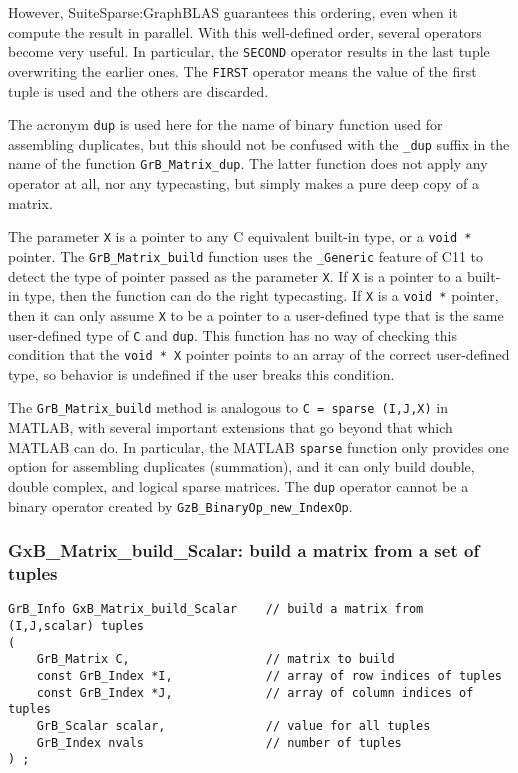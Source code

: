 \documentclass[12pt]{article}
\begin{document}
However, SuiteSparse:GraphBLAS guarantees this ordering, even when it compute
the result in parallel.  With this well-defined order, several operators become
very useful.  In particular, the \verb'SECOND' operator results in the last
tuple overwriting the earlier ones.  The \verb'FIRST' operator means the value
of the first tuple is used and the others are discarded.

The acronym \verb'dup' is used here for the name of binary function used for
assembling duplicates, but this should not be confused with the \verb'_dup'
suffix in the name of the function \verb'GrB_Matrix_dup'.  The latter function
does not apply any operator at all, nor any typecasting, but simply makes a
pure deep copy of a matrix.

The parameter \verb'X' is a pointer to any C equivalent built-in type, or a
\verb'void *' pointer.  The \verb'GrB_Matrix_build' function uses the
\verb'_Generic' feature of C11 to detect the type of pointer passed as the
parameter \verb'X'.  If \verb'X' is a pointer to a built-in type, then the
function can do the right typecasting.  If \verb'X' is a \verb'void *' pointer,
then it can only assume \verb'X' to be a pointer to a user-defined type that is
the same user-defined type of \verb'C' and \verb'dup'.  This function has no
way of checking this condition that the \verb'void * X' pointer points to an
array of the correct user-defined type, so behavior is undefined if the user
breaks this condition.

The \verb'GrB_Matrix_build' method is analogous to \verb'C = sparse (I,J,X)' in
MATLAB, with several important extensions that go beyond that which MATLAB can
do.  In particular, the MATLAB \verb'sparse' function only provides one option
for assembling duplicates (summation), and it can only build double, double
complex, and logical sparse matrices.
%
The \verb'dup' operator cannot be a binary operator
created by \verb'GzB_BinaryOp_new_IndexOp'.

\subsubsection{{\sf GxB\_Matrix\_build\_Scalar:} build a matrix from a set of tuples}
\label{matrix_build_Scalar}

\begin{mdframed}[userdefinedwidth=6in]
{\footnotesize
\begin{verbatim}
GrB_Info GxB_Matrix_build_Scalar    // build a matrix from (I,J,scalar) tuples
(
    GrB_Matrix C,                   // matrix to build
    const GrB_Index *I,             // array of row indices of tuples
    const GrB_Index *J,             // array of column indices of tuples
    GrB_Scalar scalar,              // value for all tuples
    GrB_Index nvals                 // number of tuples
) ;
\end{verbatim} } \end{mdframed}
\end{document}
